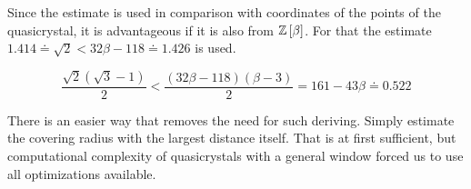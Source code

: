 \documentclass[text.tex]{subfiles}
\begin{document}
Since the estimate is used in comparison with coordinates of the points of the quasicrystal, it is advantageous if it is also from $\mathbb{Z}\left[\beta\right]$. For that the estimate $1.414 \doteq \sqrt{2} <32\beta-118 \doteq 1.426$ is used.

$$\frac{\sqrt{2}(\sqrt{3}-1)}{2} < \frac{(32\beta-118)(\beta-3)}{2} = 161-43\beta \doteq 0.522$$

\begin{remark}
There is an easier way that removes the need for such deriving. Simply estimate the covering radius with the largest distance itself. That is at first sufficient, but computational complexity of quasicrystals with a general window forced us to use all optimizations available.
\end{remark}
\end{document}
